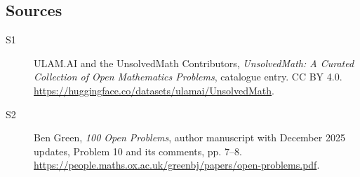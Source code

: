\documentclass[11pt]{article}
\begin{document}
\subsection{Sources}
\begin{description}
\item[\hypertarget{source:statement:1}{S1}] ULAM.AI and the UnsolvedMath Contributors, \emph{UnsolvedMath: A Curated Collection of Open Mathematics Problems}, catalogue entry. CC BY 4.0. \url{https://huggingface.co/datasets/ulamai/UnsolvedMath}.
\item[\hypertarget{source:statement:2}{S2}] Ben Green, \emph{100 Open Problems}, author manuscript with December 2025 updates, Problem 10 and its comments, pp. 7--8. \url{https://people.maths.ox.ac.uk/greenbj/papers/open-problems.pdf}.
\end{description}
\label{end:statement}
\end{document}
